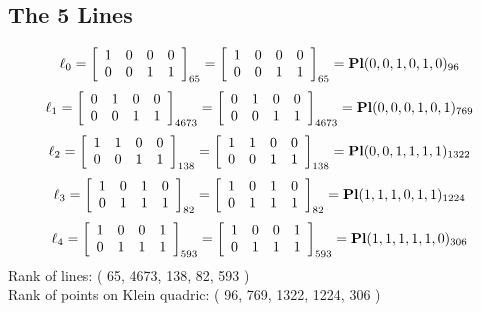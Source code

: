 \documentclass{article}
\begin{document}
{\subsection*{The 5 Lines}
$$
\ell_{0} = 
\left[
\begin{array}{*{4}{r}}
1 & 0 & 0 & 0\\
0 & 0 & 1 & 1\\
\end{array}
\right]
_{65}
=
\left[
\begin{array}{*{4}c}
1  & 0  & 0  & 0\\
0  & 0  & 1  & 1\\
\end{array}
\right]_{65}
={\rm\bf Pl}(0,0,1,0,1,0 )_{96}$$
$$
\ell_{1} = 
\left[
\begin{array}{*{4}{r}}
0 & 1 & 0 & 0\\
0 & 0 & 1 & 1\\
\end{array}
\right]
_{4673}
=
\left[
\begin{array}{*{4}c}
0  & 1  & 0  & 0\\
0  & 0  & 1  & 1\\
\end{array}
\right]_{4673}
={\rm\bf Pl}(0,0,0,1,0,1 )_{769}$$
$$
\ell_{2} = 
\left[
\begin{array}{*{4}{r}}
1 & 1 & 0 & 0\\
0 & 0 & 1 & 1\\
\end{array}
\right]
_{138}
=
\left[
\begin{array}{*{4}c}
1  & 1  & 0  & 0\\
0  & 0  & 1  & 1\\
\end{array}
\right]_{138}
={\rm\bf Pl}(0,0,1,1,1,1 )_{1322}$$
$$
\ell_{3} = 
\left[
\begin{array}{*{4}{r}}
1 & 0 & 1 & 0\\
0 & 1 & 1 & 1\\
\end{array}
\right]
_{82}
=
\left[
\begin{array}{*{4}c}
1  & 0  & 1  & 0\\
0  & 1  & 1  & 1\\
\end{array}
\right]_{82}
={\rm\bf Pl}(1,1,1,0,1,1 )_{1224}$$
$$
\ell_{4} = 
\left[
\begin{array}{*{4}{r}}
1 & 0 & 0 & 1\\
0 & 1 & 1 & 1\\
\end{array}
\right]
_{593}
=
\left[
\begin{array}{*{4}c}
1  & 0  & 0  & 1\\
0  & 1  & 1  & 1\\
\end{array}
\right]_{593}
={\rm\bf Pl}(1,1,1,1,1,0 )_{306}$$
Rank of lines: ( 65, 4673, 138, 82, 593 )\\
Rank of points on Klein quadric: ( 96, 769, 1322, 1224, 306 )\\
}
\end{document}
